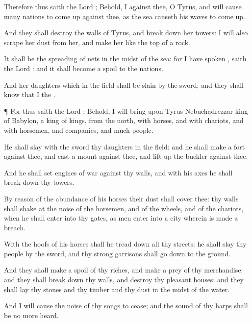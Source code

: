 {Therefore thus
saith the
Lord
{}; Behold, I
{} against thee, O
Tyrus, and will cause
many
nations to come
up against thee, as the
sea causeth his
waves to come
up.

And they shall
destroy the
walls of
Tyrus, and break
down her
towers: I will also
scrape her
dust from her, and
make her like the
top of a
rock.

It shall be
{} the
spreading of
nets in the
midst of the
sea: for I have
spoken
{},
saith the
Lord
{}: and it shall become a
spoil to the
nations.

And her
daughters which
{} in the
field shall be
slain by the
sword; and they shall
know that I
{} the
{}.


\par }{\PP {}¶ For thus
saith the
Lord
{}; Behold, I will
bring upon
Tyrus
Nebuchadrezzar
king of
Babylon, a
king of
kings, from the
north, with
horses, and with
chariots, and with
horsemen, and
companies, and
much
people.

He shall
slay with the
sword thy
daughters in the
field: and he shall
make a
fort against thee, and
cast a
mount against thee, and lift
up the
buckler against thee.

And he shall
set
engines of
war against thy
walls, and with his
axes he shall break
down thy
towers.

By reason of the
abundance of his
horses their
dust shall
cover thee: thy
walls shall
shake at the
noise of the
horsemen, and of the
wheels, and of the
chariots, when he shall
enter into thy
gates, as men
enter into a
city wherein is made a
breach.

With the
hoofs of his
horses shall he tread
down all thy
streets: he shall
slay thy
people by the
sword, and thy
strong
garrisons shall go
down to the
ground.

And they shall make a
spoil of thy
riches, and make a
prey of thy
merchandise: and they shall break
down thy
walls, and
destroy thy
pleasant
houses: and they shall
lay thy
stones and thy
timber and thy
dust in the
midst of the
water.

And I will cause the
noise of thy
songs to
cease; and the
sound of thy
harps shall be no more
heard.

}
